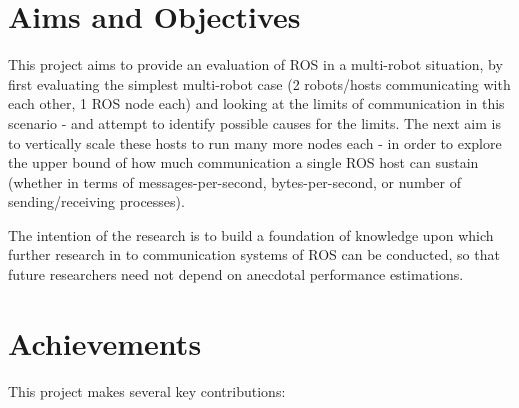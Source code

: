 \documentclass[../dissertation.tex]{subfiles}
\begin{document}
\section{Aims and Objectives}

This project aims to provide an evaluation of ROS in a multi-robot situation, by first evaluating the simplest multi-robot case (2 robots/hosts communicating with each other, 1 ROS node each) and looking at the limits of communication in this scenario - and attempt to identify possible causes for the limits. The next aim is to vertically scale these hosts to run many more nodes each - in order to explore the upper bound of how much communication a single ROS host can sustain (whether in terms of messages-per-second, bytes-per-second, or number of sending/receiving processes).

The intention of the research is to build a foundation of knowledge upon which further research in to communication systems of ROS can be conducted, so that future researchers need not depend on anecdotal performance estimations.

\section{Achievements}

This project makes several key contributions:
\end{document}

